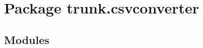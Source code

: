 %
%
%


\section{Package trunk.csvconverter}

    \label{trunk:csvconverter}


\subsection{Modules}

